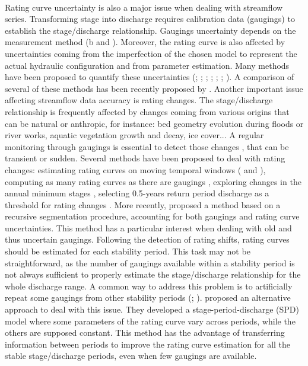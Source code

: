 \documentclass[11pt]{article}
\begin{document}
    \paragraph{}
    Rating curve uncertainty is also a major issue when dealing with streamflow series. Transforming stage into discharge requires calibration data (gaugings) to establish the stage/discharge relationship. Gaugings uncertainty depends on the measurement method (\citet{lecoz_quantification_2014}b and \citet{puechberty_charte_2017}). Moreover, the rating curve is also affected by uncertainties coming from the imperfection of the chosen model to represent the actual hydraulic configuration and from parameter estimation. Many methods have been proposed to quantify these uncertainties (\citet{petersen-overleir_bayesian_2009}; \citet{juston_rating_2014}; \citet{le_coz_combining_2014}; \citet{morlot_dynamic_2014}; \citet{coxon_novel_2015}; \citet{mcmillan_rating_2015}; \citet{mansanarez_rapid_2019}). A comparison of several of these methods has been recently proposed by \citet{kiang_comparison_2018}. Another important issue affecting streamflow data accuracy is rating changes. The stage/discharge relationship is frequently affected by changes coming from various origins that can be natural or anthropic, for instance: bed geometry evolution during floods or river works, aquatic vegetation growth and decay, ice cover... A regular monitoring through gaugings is essential to detect those changes \citep{ibbitt_gauging_1987}, that can be transient or sudden. Several methods have been proposed to deal with rating changes: estimating rating curves on moving temporal windows (\citet{westerberg_stage-discharge_2011} and \citet{guerrero_temporal_2012}), computing as many rating curves as there are gaugings \citep{morlot_dynamic_2014}, exploring changes in the annual minimum stages \citep{lapuszek_methods_2015}, selecting 0.5-years return period discharge as a threshold for rating changes \citep{mcmillan_impacts_2010}. More recently, \citet{darienzo_detection_2021} proposed a method based on a recursive segmentation procedure, accounting for both gaugings and rating curve uncertainties. This method has a particular interest when dealing with old and thus uncertain gaugings. Following the detection of rating shifts, rating curves should be estimated for each stability period. This task may not be straightforward, as the number of gaugings available within a stability period is not always sufficient to properly estimate the stage/discharge relationship for the whole discharge range. A common way to address this problem is to artificially repeat some gaugings from other stability periods (\citet{mcmillan_benchmarking_2012}; \citet{puechberty_charte_2017}). \citet{mansanarez_shift_2019} proposed an alternative approach to deal with this issue. They developed a stage-period-discharge (SPD) model where some parameters of the rating curve vary across periods, while the others are supposed constant. This method has the advantage of transferring information between periods to improve the rating curve estimation for all the stable stage/discharge periods, even when few gaugings are available.
\end{document}
